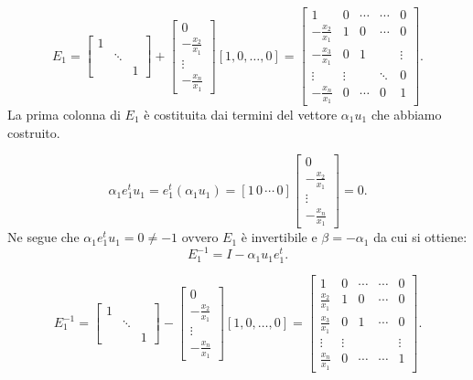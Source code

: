 \begin{ese}
\[
E_1  =
\left[\begin{array}{ccc}
1 & & \\
 & \ddots & \\
& & 1
\end{array}\right] +
\left[\begin{array}{c}
0 \\
-\frac{x_2}{x_1} \\
\vdots \\
-\frac{x_n}{x_1}
\end{array}\right] \left[ 1, 0, \ldots, 0\right] =
\left[\begin{array}{ccccc}
1 & 0 &\cdots  &\cdots & 0 \\
-\frac{x_2}{x_1} & 1 & 0  & \cdots & 0 \\
-\frac{x_3}{x_1} & 0 & 1  & & \vdots \\
\vdots & \vdots & & \ddots & 0 \\
-\frac{x_n}{x_1} & 0 & \cdots & 0 &1
\end{array}\right].
\]
La prima colonna di $E_1$ è costituita dai termini del vettore $\alpha_1u_1$
che abbiamo costruito.

\[
\alpha_1e_1^tu_1 = e_1^t(\alpha_1u_1) = [1 \, 0 \, \cdots\,0]
\left[\begin{array}{c}0 \\ -\frac{x_2}{x_1}\\ \vdots \\ -\frac{x_n}{x_1}
\end{array}\right] = 0.
\]
Ne segue che $\alpha_1e_1^tu_1 = 0 \neq -1$ ovvero $E_1$ è invertibile e $\beta
= -\alpha_1$ da cui si ottiene:
\[E_1^{-1} = I -\alpha_1u_1e_1^t.
\]

\[
E_1^{-1}  =
\left[\begin{array}{ccc}
1 & & \\
 & \ddots & \\
& & 1
\end{array}\right] -
\left[\begin{array}{c}
0 \\
-\frac{x_2}{x_1} \\
\vdots \\
-\frac{x_n}{x_1}
\end{array}\right] \left[ 1, 0, \ldots, 0\right] =
\left[\begin{array}{ccccc}
1 & 0 &\cdots  &\cdots & 0 \\
\frac{x_2}{x_1} & 1 & 0  & \cdots & 0 \\
\frac{x_3}{x_1} & 0 & 1  & \cdots & 0 \\
\vdots & \vdots & & &\vdots \\
\frac{x_n}{x_1} & 0 & \cdots &\cdots &1
\end{array}\right].
\]
\end{ese}


